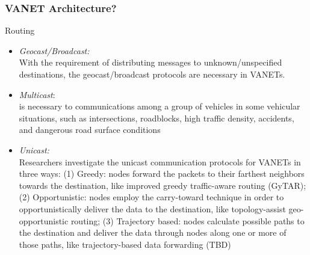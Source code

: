 \documentclass{beamer}
\begin{document}
\begin{frame}
	
	\frametitle{VANET Architecture?}
		\begin{block}{Routing }
			\begin{itemize}

				\item \textit{Geocast/Broadcast:}\\ With the requirement of distributing messages to unknown/unspecified destinations, the geocast/broadcast protocols are necessary in VANETs.

			\item \textit{Multicast}: \\is necessary to communications among a group of vehicles in some vehicular situations, such as intersections, roadblocks, high traffic density, accidents, and dangerous road surface conditions
			
			\item \textit{Unicast:} \\Researchers investigate the unicast communication protocols for VANETs in three ways: 
			(1) Greedy: nodes forward the packets to their farthest neighbors towards the destination, like improved greedy traffic-aware routing (GyTAR); 
			(2) Opportunistic: nodes employ the carry-toward technique in order to opportunistically deliver the data to the destination, like topology-assist geo-opportunistic routing;
			(3) Trajectory based: nodes calculate possible paths to the destination and deliver the data through nodes along one or more of those paths, like trajectory-based data forwarding (TBD)
			
			
			
				
				
			\end{itemize}
			
		\end{block}
		
	
\end{frame}

\end{document}
